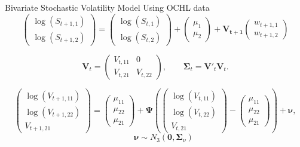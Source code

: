 \documentclass{beamer}
\begin{document}
\begin{frame}{Bivariate Stochastic Volatility Model Using OCHL data}
		\[ \left( \begin{array}{c} \log(S_{t+1,1}) \\ \log( S_{t+1,2}) \end{array} \right) = \left( \begin{array}{c} \log(S_{t,1}) \\ \log( S_{t,2}) \end{array} \right) + \left( \begin{array}{c} \mu_1 \\ \mu_2 \end{array} \right) + \mathbf{V_{t+1}} \left( \begin{array}{c} w_{t+1,1} \\ w_{t+1,2} \end{array} \right) \]

\[
 	\mathbf{V}_{t} = \left( \begin{array}{cc} 
					V_{t,11} & 0 \\
					V_{t,21} & V_{t,22}
					\end{array} \right), \qquad \boldsymbol{\Sigma}_t = \mathbf{V}'_{t} \mathbf{V}_t.
\]

\[
	\left( \begin{array}{c} \log(V_{t+1,11}) \\ \log(V_{t+1,22}) \\ V_{t+1,21} \end{array} \right) = \left( \begin{array}{c} \mu_{11} \\ \mu_{22} \\ \mu_{21} \end{array} \right) + \boldsymbol{\Psi} \left( \left( \begin{array}{c} \log(V_{t,11}) \\ \log(V_{t,22}) \\ V_{t,21} \end{array} \right) - \left( \begin{array}{c} \mu_{11} \\ \mu_{22} \\ \mu_{21} \end{array} \right) \right) + \boldsymbol{\nu},
\]
\[ \qquad \boldsymbol{\nu} \sim N_3(\mathbf{0}, \boldsymbol{\Sigma}_\nu) \]

\end{frame}
\end{document}
